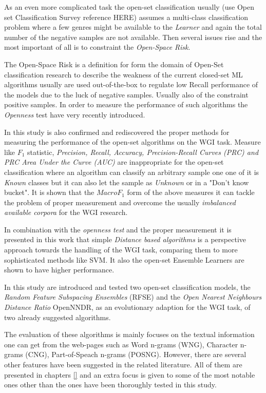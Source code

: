 \documentclass[
    11pt, %
    english, %
    singlespacing, %
    headsepline, %
]{DoctoralThesis} %
\begin{document}
As an even more complicated task the open-set classification usually (use Open set Classification Survey reference HERE) assumes a multi-class classification problem where a few genres might be available to the \textit{Learner} and again the total number of the negative samples are not available. Then several issues rise and the most important of all is to constraint the \textit{Open-Space Risk}. 

The {Open-Space Risk} is a definition for form the domain of Open-Set classification research to describe the weakness of the current closed-set ML algorithms usually are used out-of-the-box to regulate low Recall performance of the models due to the luck of negative samples. Usually also of the constraint positive samples. In order to measure the performance of such algorithms the \textit{Openness} test have very recently introduced. 

In this study is also confirmed and rediscovered the proper methods for measuring the performance of the open-set algorithms on the WGI task. Measure like $F_{1}$ statistic, \textit{Precision, Recall, Accuracy, Precision-Recall Curves (PRC) and PRC Area Under the Curve (AUC)} are inappropriate for the open-set classification where an algorithm can classify an arbitrary sample one one of it is \textit{Known} classes but it can also let the sample as \textit{Unknown} or in a "Don't know bucket". It is shown that the $Macro F_{1}$ form of the above measures it can tackle the problem of proper measurement and overcome the usually \textit{imbalanced available corpora} for the WGI research. 

In combination with the \textit{openness test} and the proper measurement it is presented in this work that simple \textit{Distance based algorithms} is a perspective approach towards the handling of the WGI task, comparing them to more sophisticated methods like SVM. It also the open-set Ensemble Learners are shown to have higher performance. 

In this study are introduced and tested two open-set classification models, the \textit{Random Feature Subspacing Ensembles} (RFSE) and the \textit{Open Nearest Neighbours Distance Ratio} OpenNNDR, as an evolutionary adaption for the WGI task, of two already suggested algorithms. 

The evaluation of these algorithms is mainly focuses on the textual information one can get from the web-pages such as Word n-grams (WNG), Character n-grams (CNG), Part-of-Speach n-grams (POSNG). However, there are several other features have been suggested in the related literature. All of them are presented in chapters \ref{} and an extra focus is given to some of the most notable ones other than the ones have been thoroughly tested in this study.
\end{document}

